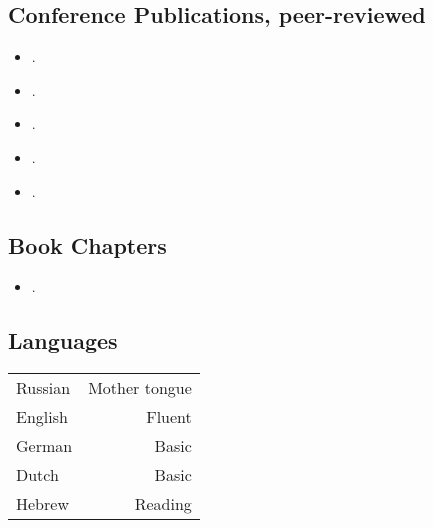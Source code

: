 \subsection*{Conference Publications, peer-reviewed}

\begin{itemize}
\item {}.
\item {}.
\item {}.
\item {}.
\item {}.
\end{itemize}

\subsection*{Book Chapters}


\begin{itemize}
\item {}.
\end{itemize}

\subsection*{Languages}
\begin{tabular}{L!{\VRule}R}
Russian & Mother tongue \\
English & Fluent \\
German & Basic \\
Dutch & Basic \\
Hebrew & Reading \\ 
\end{tabular}
